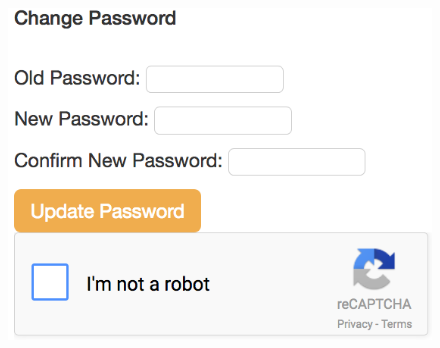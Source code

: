 \begin{enumerate}
    \begin{figure}[h]
    	\centering
    	\includegraphics[scale=0.44,center]{chapters/chapter03/figures/captchaGoogle.png}
    	\label{googleRecaptcha}
    \end{figure}  
    
    \newpage
    

\end{enumerate}
